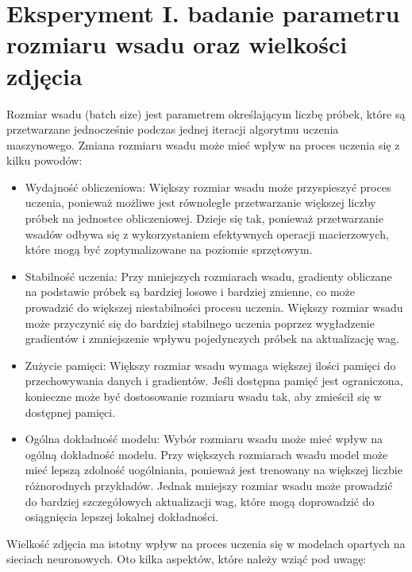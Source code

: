 \documentclass[12pt,twoside]{article}
\begin{document}
\section{Eksperyment I. badanie parametru rozmiaru wsadu oraz wielkości zdjęcia }


Rozmiar wsadu (batch size) jest parametrem określającym liczbę próbek, które są przetwarzane jednocześnie podczas jednej iteracji algorytmu uczenia maszynowego. Zmiana rozmiaru wsadu może mieć wpływ na proces uczenia się z kilku powodów:

 \begin{itemize}
	\item Wydajność obliczeniowa: Większy rozmiar wsadu może przyspieszyć proces uczenia, ponieważ możliwe jest równoległe przetwarzanie większej liczby próbek na jednostce obliczeniowej. Dzieje się tak, ponieważ przetwarzanie wsadów odbywa się z wykorzystaniem efektywnych operacji macierzowych, które mogą być zoptymalizowane na poziomie sprzętowym.

\item Stabilność uczenia: Przy mniejszych rozmiarach wsadu, gradienty obliczane na podstawie próbek są bardziej losowe i bardziej zmienne, co może prowadzić do większej niestabilności procesu uczenia. Większy rozmiar wsadu może przyczynić się do bardziej stabilnego uczenia poprzez wygładzenie gradientów i zmniejszenie wpływu pojedynczych próbek na aktualizację wag.

\item Zużycie pamięci: Większy rozmiar wsadu wymaga większej ilości pamięci do przechowywania danych i gradientów. Jeśli dostępna pamięć jest ograniczona, konieczne może być dostosowanie rozmiaru wsadu tak, aby zmieścił się w dostępnej pamięci.

\item Ogólna dokładność modelu: Wybór rozmiaru wsadu może mieć wpływ na ogólną dokładność modelu. Przy większych rozmiarach wsadu model może mieć lepszą zdolność uogólniania, ponieważ jest trenowany na większej liczbie różnorodnych przykładów. Jednak mniejszy rozmiar wsadu może prowadzić do bardziej szczegółowych aktualizacji wag, które mogą doprowadzić do osiągnięcia lepszej lokalnej dokładności.

 \end{itemize}

 Wielkość zdjęcia ma istotny wpływ na proces uczenia się w modelach opartych na sieciach neuronowych. Oto kilka aspektów, które należy wziąć pod uwagę:
\end{document}
